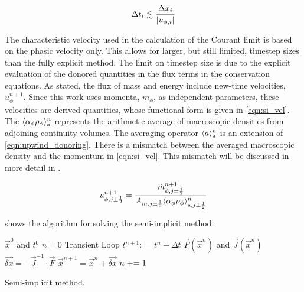 \begin{equation}
\label{eqn:si_cfl}
\dt{}_i \lesssim \frac{\dx{}_i}{|u_{\phi,i}|}
\end{equation}

The characteristic velocity used in the calculation of the Courant limit is based on the phasic velocity only.
This allows for larger, but still limited, timestep sizes than the fully explicit method.
The limit on timestep size is due to the explicit evaluation of the donored quantities in the flux terms in the conservation equations.
As stated, the flux of mass and energy include new-time velocities, $u^{n+1}_{\phi}$.
Since this work uses momenta, $\dot{m}_{\phi}$, as independent parameters, these velocities are derived quantities, whose functional form is given in \eqref{eqn:si_vel}.
The $\ave{\alpha_{\phi} \rho_{\phi}}^{n}_{\text{a}}$ represents the arithmetic average of macroscopic densities from adjoining continuity volumes.
The averaging operator $\ave{a}^{n}_{\text{a}}$ is an extension of \eqref{eqn:upwind_donoring}.
There is a mismatch between the averaged macroscopic density and the momentum in \eqref{eqn:si_vel}.
This mismatch will be discussed in more detail in .

\begin{equation}
\label{eqn:si_vel}
u^{n+1}_{\phi, j \pm \onehalf} = \frac{\dot{m}^{n+1}_{\phi, j \pm \onehalf}}{A_{m, j \pm \onehalf} \ave{\alpha_{\phi} \rho_{\phi}}^{n}_{\text{a}, j \pm \onehalf}} 
\end{equation}

 shows the algorithm for solving the semi-implicit method.

\begin{algo}[ht!]
\setlength{\baselineskip}{0.625\baselineskip}
\begin{algorithmic}[1]
\Require $\vec{x}^{0}$ and $t^{0}$
\Set $n = 0$
\Loop \; Transient Loop
    \Set $t^{n+1} : = t^{n} + \Delta t$
	\Calculate $\vec{F}(\vec{x}^{n})$ and $\vec{J}(\vec{x}^{n})$
	\Calculate $\vec{\delta x} = - \vec{J}^{-1}\cdot\vec{F}$
	\Calculate $\vec{x}^{n+1} = \vec{x}^{n} + \vec{\delta x}$
	\Set $n \mathrel{+}= 1$
\EndLoop
\end{algorithmic}
\caption{Semi-implicit method.}
\label{alg:si_legacy}
\end{algo}

